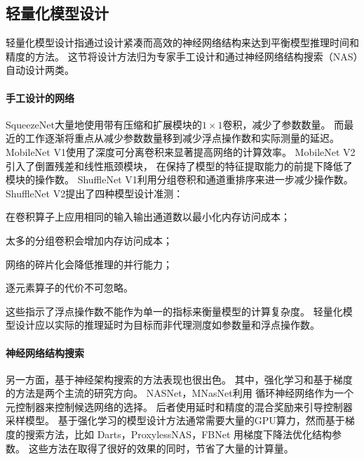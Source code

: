 \subsection{轻量化模型设计}
轻量化模型设计指通过设计紧凑而高效的神经网络结构来达到平衡模型推理时间和精度的方法。
这节将设计方法归为专家手工设计和通过神经网络结构搜索（NAS）自动设计两类。

\paragraph{手工设计的网络}
SqueezeNet\cite{iandola2016squeezenet}大量地使用带有压缩和扩展模块的$1\times 1$卷积，减少了参数数量。
而最近的工作逐渐将重点从减少参数数量移到减少浮点操作数和实际测量的延迟。
MobileNet V1\cite{howard2017mobilenets}使用了深度可分离卷积来显著提高网络的计算效率。
MobileNet V2\cite{sandler2018mobilenetv2}引入了倒置残差和线性瓶颈模块，
在保持了模型的特征提取能力的前提下降低了模块的操作数。
ShuffleNet V1\cite{zhang2018shufflenet}利用分组卷积和通道重排序来进一步减少操作数。
ShuffleNet V2\cite{ma2018shufflenet}提出了四种模型设计准测：
\begin{enumerate*}
    \item 在卷积算子上应用相同的输入输出通道数以最小化内存访问成本；
    \item 太多的分组卷积会增加内存访问成本；
    \item 网络的碎片化会降低推理的并行能力；
    \item 逐元素算子的代价不可忽略。
\end{enumerate*}
这些指示了浮点操作数不能作为单一的指标来衡量模型的计算复杂度。
轻量化模型设计应以实际的推理延时为目标而非代理测度如参数量和浮点操作数。

\paragraph{神经网络结构搜索}
另一方面，基于神经架构搜索的方法表现也很出色。
其中，强化学习和基于梯度的方法是两个主流的研究方向。
NASNet\cite{zoph2018learning}，MNasNet\cite{tan2019mnasnet}利用
循环神经网络作为一个元控制器来控制候选网络的选择。
后者使用延时和精度的混合奖励来引导控制器采样模型。
基于强化学习的模型设计方法通常需要大量的GPU算力，然而基于梯度的搜索方法，比如
Darts\cite{liu2018darts}，ProxylessNAS\cite{cai2018proxylessnas}，FBNet\cite{wu2019fbnet}
用梯度下降法优化结构参数。
这些方法在取得了很好的效果的同时，节省了大量的计算量。